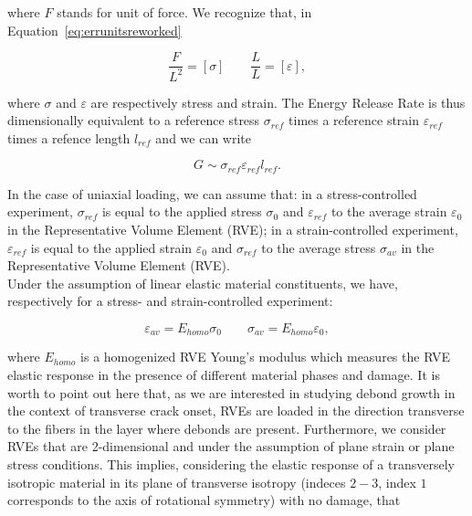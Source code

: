 \documentclass[a4paper,fleqn]{cas-dc}
\begin{document}
where $F$ stands for unit of force. We recognize that, in Equation~\ref{eq:errunitsreworked}

\begin{equation}\label{eq:sigmaepsunits}
\frac{F}{L^{2}}=\left[\sigma\right]\qquad\frac{L}{L}=\left[\varepsilon\right],
\end{equation}

where $\sigma$ and $\varepsilon$ are respectively stress and strain. The Energy Release Rate is thus dimensionally equivalent to a reference stress $\sigma_{ref}$ times a reference strain $\varepsilon_{ref}$ times a refence length $l_{ref}$ and we can write

\begin{equation}\label{eq:G}
G\sim\sigma_{ref}\varepsilon_{ref}l_{ref}.
\end{equation}

In the case of uniaxial loading, we can assume that: in a stress-controlled experiment, $\sigma_{ref}$ is equal to the applied stress $\sigma_{0}$ and $\varepsilon_{ref}$ to the average strain $\varepsilon_{0}$ in the Representative Volume Element (RVE); in a strain-controlled experiment, $\varepsilon_{ref}$ is equal to the applied strain $\varepsilon_{0}$ and $\sigma_{ref}$ to the average stress $\sigma_{av}$ in the Representative Volume Element (RVE).\\
Under the assumption of linear elastic material constituents, we have, respectively for a stress- and strain-controlled experiment:

\begin{equation}\label{eq:elasticresponse}
\varepsilon_{av}=E_{homo}\sigma_{0}\qquad\sigma_{av}=E_{homo}\varepsilon_{0},
\end{equation}

where $E_{homo}$ is a homogenized RVE Young's modulus which measures the RVE elastic response in the presence of different material phases and damage. It is worth to point out here that, as we are interested in studying debond growth in the context of transverse crack onset, RVEs are loaded in the direction transverse to the fibers in the layer where debonds are present. Furthermore, we consider RVEs that are 2-dimensional and under the assumption of plane strain or plane stress conditions. This implies, considering the elastic response of a transversely isotropic material in its plane of transverse isotropy (indeces $2-3$, index $1$ corresponds to the axis of rotational symmetry) with no damage, that~\cite{Timoshenko1987,Mantic2009}
\end{document}
